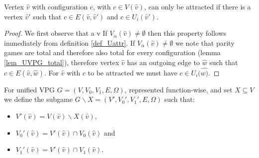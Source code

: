 \begin{lemma}
	\label{lem_attr_requires_E}
	Vertex $\hat{v}$ with configuration $c$, with $c \in V(\hat{v})$, can only be attracted if there is a vertex $\hat{v}'$ such that $c \in E(\hat{v}, \hat{v}')$ and $c \in U_i(\hat{v}')$.
	\begin{proof}
		We first observe that a v If $V_\alpha(\hat{v}) \neq \emptyset$ then this property follows immediately from definition \ref{def_Uattr}. If $V_{\overline{\alpha}}(\hat{v}) \neq \emptyset$ we note that parity games are total and therefore also total for every configuration (lemma \ref{lem_UVPG_total}), therefore vertex $\hat{v}$ has an outgoing edge to $\hat{w}$ such that $c \in E(\hat{v},\hat{w})$. For $\hat{v}$ with $c$ to be attracted we must have $c \in U_i(\hat{w)}$.
	\end{proof}
\end{lemma}

\begin{definition}
	\label{def_Usubgame}
	For unified VPG $G = (V,V_0,V_1,E,\Omega)$, represented function-wise, and set $X \subseteq V$ we define the subgame $G \backslash X = (V',V_0',V_1',E,\Omega)$ such that:
	\begin{itemize}
		\item $V'(\hat{v}) = V(\hat{v}) \backslash X(\hat{v})$,
		\item $V_0'(\hat{v}) = V'(\hat{v}) \cap V_0(\hat{v})$ and
		\item $V_1'(\hat{v}) = V'(\hat{v}) \cap V_1(\hat{v})$.
	\end{itemize}
\end{definition}

